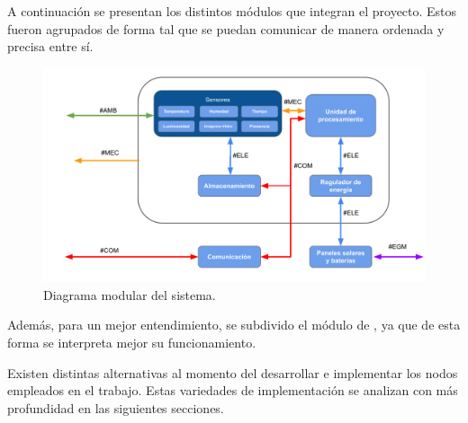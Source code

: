 %
%
%



A continuación se presentan los distintos módulos que integran el proyecto. Estos fueron agrupados de forma tal que se puedan comunicar de manera ordenada y precisa entre sí.
\begin{figure}[H]
	\centering
	\includegraphics[width=0.9\linewidth]{ImagenesFactibilidad/EsquemaModular}
	\caption{Diagrama modular del sistema.}
	\label{fig:esquema_modular}
\end{figure}

Además, para un mejor entendimiento, se subdivido el módulo de , ya que de esta forma se interpreta mejor su funcionamiento.

Existen distintas alternativas al momento del desarrollar e implementar los nodos empleados en el trabajo. Estas variedades de implementación se analizan con más profundidad en las siguientes secciones.





%

\label{sec:antenas}






